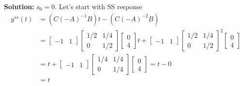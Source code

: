 \documentclass[twoside]{article}
\begin{document}
\textbf{Solution:} $s_0 = 0$. Let's start with SS response 
%
\begin{align*} 
y^{ss}(t) &= \left( C \left(- A \right)^{-1} B \right) t  - \left( C \left(- A \right)^{-2} B \right) 
\\[1ex]
 &=  \begin{bmatrix} -1 & 1 \end{bmatrix}  \begin{bmatrix} 1/2 & 1/4 \\ 0 & 1/2 \end{bmatrix}  \begin{bmatrix} 0 \\ 4 \end{bmatrix} t  
+  \begin{bmatrix} -1 & 1 \end{bmatrix}  \begin{bmatrix} 1/2 & 1/4 \\ 0 & 1/2 \end{bmatrix}^2  \begin{bmatrix} 0 \\ 4 \end{bmatrix}
\\[1ex]
 &= t + \begin{bmatrix} -1 & 1 \end{bmatrix}  \begin{bmatrix} 1/4 & 1/4 \\ 0 & 1/4 \end{bmatrix}  \begin{bmatrix} 0 \\ 4 \end{bmatrix} = t - 0
\\[1ex]
 &= t
\end{align*}
\end{document}
